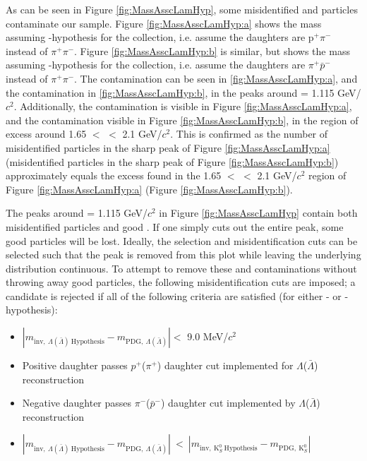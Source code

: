\documentclass[/home/jesse/Analysis/FemtoAnalysis/AnalysisNotes/AnalysisNoteJBuxton.tex]{subfiles}
\begin{document}
As can be seen in Figure \ref{fig:MassAsscLamHyp}, some misidentified \Lam and \ALam particles contaminate our \Ks sample.
Figure \ref{fig:MassAsscLamHyp:a} shows the mass assuming \Lam-hypothesis for the \Ks collection, i.e. assume the daughters are p$^{+}\pi^{-}$ instead of $\pi^{+}\pi^{-}$.
Figure \ref{fig:MassAsscLamHyp:b} is similar, but shows the mass assuming \ALam-hypothesis for the collection, i.e. assume the daughters are $\pi^{+}\bar{p}^{-}$ instead of $\pi^{+}\pi^{-}$.
The \Lam contamination can be seen in \ref{fig:MassAsscLamHyp:a}, and the \ALam contamination in \ref{fig:MassAsscLamHyp:b}, in the peaks around \minv = 1.115 GeV/$c^{2}$.
Additionally, the \ALam contamination is visible in Figure \ref{fig:MassAsscLamHyp:a}, and the \Lam contamination visible in Figure \ref{fig:MassAsscLamHyp:b}, in the region of excess around 1.65 $<$ \minv $<$ 2.1 GeV/$c^{2}$.
This is confirmed as the number of misidentified \Lam particles in the sharp peak of Figure \ref{fig:MassAsscLamHyp:a} (misidentified \ALam particles in the sharp peak of Figure \ref{fig:MassAsscLamHyp:b}) approximately equals the excess found in the 1.65 $<$ \minv $<$ 2.1 GeV/$c^{2}$ region of Figure \ref{fig:MassAsscLamHyp:a} (Figure \ref{fig:MassAsscLamHyp:b}).

The peaks around \minv = 1.115 GeV/$c^{2}$ in Figure \ref{fig:MassAsscLamHyp} contain both misidentified \LamALam particles and good \Ks.
If one simply cuts out the entire peak, some good \Ks particles will be lost.
Ideally, the \Ks selection and \LamALam misidentification cuts can be selected such that the peak is removed from this plot while leaving the underlying distribution continuous.
To attempt to remove these \Lam and \ALam contaminations without throwing away good \Ks particles, the following misidentification cuts are imposed; a \Ks candidate is rejected if all of the following criteria are satisfied (for either \Lam- or \ALam-hypothesis):
\begin{itemize}
 \item $\left|m_{\mathrm{inv}, \ \Lambda(\bar{\Lambda}) \ \mathrm{Hypothesis}} - m_{\mathrm{PDG},\ \Lambda(\bar{\Lambda})}\right| < $ 9.0 MeV/$c^{2}$
 \item Positive daughter passes $p^{+}$($\pi^{+}$) daughter cut implemented for $\Lambda$($\bar{\Lambda}$) reconstruction
 \item Negative daughter passes $\pi^{-}$($\bar{p}^{-}$) daughter cut implemented by $\Lambda$($\bar{\Lambda}$) reconstruction
 \item $\left|m_{\mathrm{inv}, \ \Lambda(\bar{\Lambda}) \ \mathrm{Hypothesis}} - m_{\mathrm{PDG},\ \Lambda(\bar{\Lambda})}\right|~ < ~\left|m_{\mathrm{inv},~ \mathrm{K}^{0}_{S}~ \mathrm{Hypothesis}} - m_{\mathrm{PDG},~ \mathrm{K}^{0}_{S}}\right|$
\end{itemize} 
\end{document}
